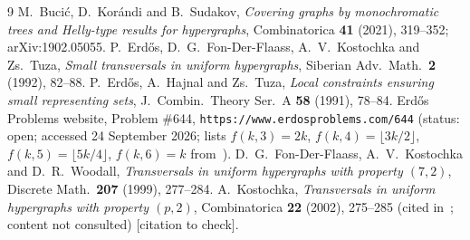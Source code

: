 \documentclass[11pt]{amsart}
\theoremstyle{definition}
\theoremstyle{remark}
\begin{document}
\begin{thebibliography}{9}
 M.~Buci\'c, D.~Kor\'andi and B.~Sudakov, \emph{Covering graphs by monochromatic trees and Helly-type results for hypergraphs}, Combinatorica \textbf{41} (2021), 319--352; arXiv:1902.05055.
 P.~Erd\H{o}s, D.~G.~Fon-Der-Flaass, A.~V.~Kostochka and Zs.~Tuza, \emph{Small transversals in uniform hypergraphs}, Siberian Adv.\ Math.\ \textbf{2} (1992), 82--88.
 P.~Erd\H{o}s, A.~Hajnal and Zs.~Tuza, \emph{Local constraints ensuring small representing sets}, J.\ Combin.\ Theory Ser.~A \textbf{58} (1991), 78--84.
 Erd\H{o}s Problems website, Problem \#644, \texttt{https://www.erdosproblems.com/644} (status: open; accessed 24 September 2026; lists $f(k,3)=2k$, $f(k,4)=\lfloor3k/2\rfloor$, $f(k,5)=\lfloor5k/4\rfloor$, $f(k,6)=k$ from~\cite{EFKT}).
 D.~G.~Fon-Der-Flaass, A.~V.~Kostochka and D.~R.~Woodall, \emph{Transversals in uniform hypergraphs with property $(7,2)$}, Discrete Math.\ \textbf{207} (1999), 277--284.
 A.~Kostochka, \emph{Transversals in uniform hypergraphs with property $(p,2)$}, Combinatorica \textbf{22} (2002), 275--285 (cited in~\cite{BKS}; content not consulted) [citation to check].
\end{thebibliography}
\end{document}
